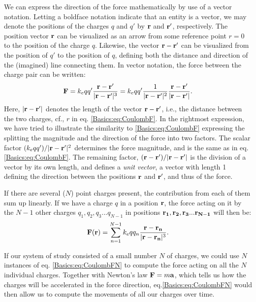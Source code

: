 We can express the direction of the force mathematically by use of a vector notation. Letting a boldface notation indicate that an entity is a vector, we may denote the positions of the charges $q$ and $q'$ by ${\bf r}$ and ${\bf r'}$, respectively. The position vector ${\bf r}$ can be visualized as an arrow from some reference point $r=0$ to the position of the charge $q$. Likewise, the vector ${\bf r}-{\bf r'}$ can be visualized from the position of $q'$ to the position of $q$, defining both the distance and direction of the (imagined) line connecting them. In vector notation, the force between the charge pair can be written:
\begin{equation}
{\bf F} = k_e q q' \frac{{\bf r}-{\bf r'}}{|{\bf r}-{\bf r'}|^3} = k_e  qq'  \frac{1}{|{\bf r}-{\bf r'}|^2} \frac{{\bf r}-{\bf r'}}{|{\bf r}-{\bf r'}|}.
\label{Basics:eq:CoulombFvec}
\end{equation}
Here, $|{\bf r}-{\bf r'}|$ denotes the length of the vector ${\bf r}-{\bf r'}$, i.e., the distance between the two charges, cf., $r$ in eq. \ref{Basics:eq:CoulombF}. In the rightmost expression, we have tried to illustrate the similarity to \ref{Basics:eq:CoulombF} expressing the splitting the magnitude and the direction of the force into two factors. The scalar factor $(k_e qq')/|{\bf r}-{\bf r'}|^2$ determines the force magnitude, and is the same as in eq. \ref{Basics:eq:CoulombF}. The remaining factor, $({\bf r}-{\bf r'})/|{\bf r}-{\bf r'}|$ is the division of a vector by its own length, and defines a \textit{unit vector}, a vector with length 1 defining the direction between the positions ${\bf r}$ and ${\bf r'}$, and thus of the force. 

If there are several ($N$) point charges present, the contribution from each of them sum up linearly. If we have a charge $q$ in a position ${\bf r}$, the force acting on it by the $N-1$ other charges $q_1, q_2, q_3 ... q_{N-1}$ in positions ${\bf r_1}, {\bf r_2}, {\bf r_3} ... {\bf r_{N-1}}$ 
will then be:
\begin{equation}
{\bf F}({\bf r}) = \sum_{n=1}^{N-1} k_e q q_n \frac{{\bf r}-{\bf r_n}}{|{\bf r}-{\bf r_n}|^3}.
\label{Basics:eq:CoulombFN}
\end{equation}

If our system of study consisted of a small number $N$ of charges, we could use $N$ instances of eq. \ref{Basics:eq:CoulombFN} to compute the force acting on all the $N$ individual charges. Together with Newton's law ${\bf F} = m {\bf a}$, which tells us how the charges will be accelerated in the force direction, eq.\ref{Basics:eq:CoulombFN} would then allow us to compute the movements of all our charges over time. 

